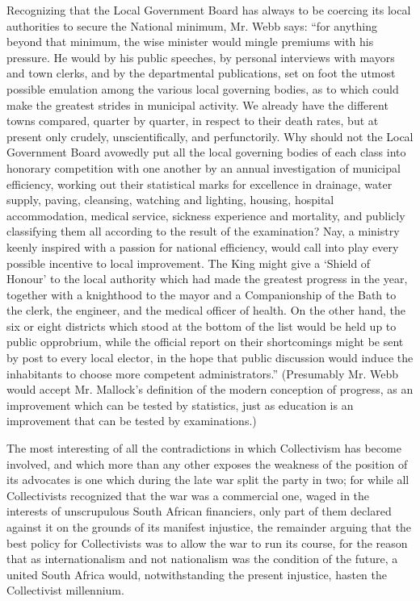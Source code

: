 \documentclass{book}
\begin{document}
Recognizing that the Local Government Board has always to be coercing its local authorities to secure the National minimum, Mr. Webb says: “for anything beyond that minimum, the wise minister would mingle premiums with his pressure. He would by his public speeches, by personal interviews with mayors and town clerks, and by the departmental publications, set on foot the utmost possible emulation among the various local governing bodies, as to which could make the greatest strides in municipal activity. We already have the different towns compared, quarter by quarter, in respect to their death rates, but at present only crudely, unscientifically, and perfunctorily. Why should not the Local Government Board avowedly put all the local governing bodies of each class into honorary competition with one another by an annual investigation of municipal efficiency, working out their statistical marks for excellence in drainage, water supply, paving, cleansing, watching and lighting, housing, hospital accommodation, medical service, sickness experience and mortality, and publicly classifying them all according to the result of the examination? Nay, a ministry keenly inspired with a passion for national efficiency, would call into play every possible incentive to local improvement. The King might give a ‘Shield of Honour’ to the local authority which had made the greatest progress in the year, together with a knighthood to the mayor and a Companionship of the Bath to the clerk, the engineer, and the medical officer of health. On the other hand, the six or eight districts which stood at the bottom of the list would be held up to public opprobrium, while the official report on their shortcomings might be sent by post to every local elector, in the hope that public discussion would induce the inhabitants to choose more competent administrators.” (Presumably Mr. Webb would accept Mr. Mallock’s definition of the modern conception of progress, as an improvement which can be tested by statistics, just as education is an improvement that can be tested by examinations.)

The most interesting of all the contradictions in which Collectivism has become involved, and which more than any other exposes the weakness of the position of its advocates is one which during the late war split the party in two; for while all Collectivists recognized that the war was a commercial one, waged in the interests of unscrupulous South African financiers, only part of them declared against it on the grounds of its manifest injustice, the remainder arguing that the best policy for Collectivists was to allow the war to run its course, for the reason that as internationalism and not nationalism was the condition of the future, a united South Africa would, notwithstanding the present injustice, hasten the Collectivist millennium.
\end{document}
